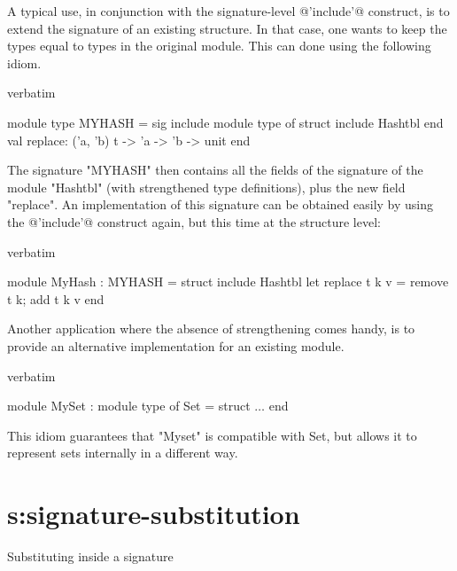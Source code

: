 A typical use, in conjunction with the signature-level @'include'@
construct, is to extend the signature of an existing structure.
In that case, one wants to keep the types equal to types in the
original module. This can done using the following idiom.
\begin{camlexample}{verbatim}
\begin{caml}
\begin{camlinput}
module type MYHASH = sig
  include module type of struct include Hashtbl end
  val replace: ('a, 'b) t -> 'a -> 'b -> unit
end
\end{camlinput}
\end{caml}
\end{camlexample}
The signature "MYHASH" then contains all the fields of the signature
of the module "Hashtbl" (with strengthened type definitions), plus the
new field "replace".  An implementation of this signature can be
obtained easily by using the @'include'@ construct again, but this
time at the structure level:
\begin{camlexample}{verbatim}
\begin{caml}
\begin{camlinput}
module MyHash : MYHASH = struct
  include Hashtbl
  let replace t k v = remove t k; add t k v
end
\end{camlinput}
\end{caml}
\end{camlexample}

Another application where the absence of strengthening comes handy, is
to provide an alternative implementation for an existing module.
\begin{camlexample}{verbatim}
\begin{caml}
\begin{camlinput}
module MySet : module type of Set = struct
  $\ldots$
end
\end{camlinput}
\end{caml}
\end{camlexample}
This idiom guarantees that "Myset" is compatible with Set, but allows
it to represent sets internally in a different way.

\section{s:signature-substitution}{Substituting inside a signature}


